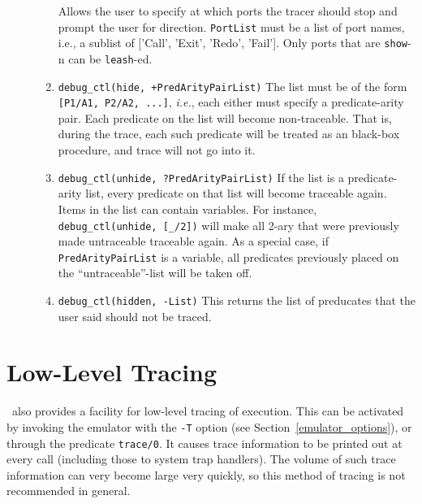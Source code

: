 \begin{description}
\begin{enumerate}
      Allows the user to specify at which ports the tracer should stop
      and prompt the user for direction.  {\tt PortList} must be a list of
      port names, i.e., a sublist of ['Call', 'Exit', 'Redo', 'Fail'].  Only
      ports that are {\tt show}-n can be {\tt leash}-ed. 
    \item {\tt debug\_ctl(hide, +PredArityPairList)}  
      The list must be of the form {\tt [P1/A1, P2/A2, ...]}, {\it i.e.},
      each either must specify a predicate-arity pair. Each predicate on
      the list will become non-traceable. That is, during the trace, each
      such predicate will be treated as an black-box procedure, and trace
      will not go into it.
    \item {\tt debug\_ctl(unhide, ?PredArityPairList)} If the list is a
      predicate-arity list, every predicate on that list will become
      traceable again. Items in the list can contain variables. For
      instance, {\tt debug\_ctl(unhide, [\_/2])} will make all 2-ary that
      were previously made untraceable traceable again.  As a special case,
      if {\tt PredArityPairList} is a variable, all predicates previously
      placed on the ``untraceable''-list will be taken off.
    \item {\tt debug\_ctl(hidden, -List)}
      This returns the list of preducates that the user said should not be
      traced.
   \end{enumerate}
\end{description}


\section{Low-Level Tracing}
 

\ourprolog\ also provides a facility for low-level tracing of execution.
This can be activated by invoking the emulator with the {\tt -T} option
(see Section~\ref{emulator_options}), or through the predicate {\tt trace/0}.
It causes trace information to be printed out at every call (including
those to system trap handlers).  The volume of such trace information
can very become large very quickly, so this method of tracing is not
recommended in general.


